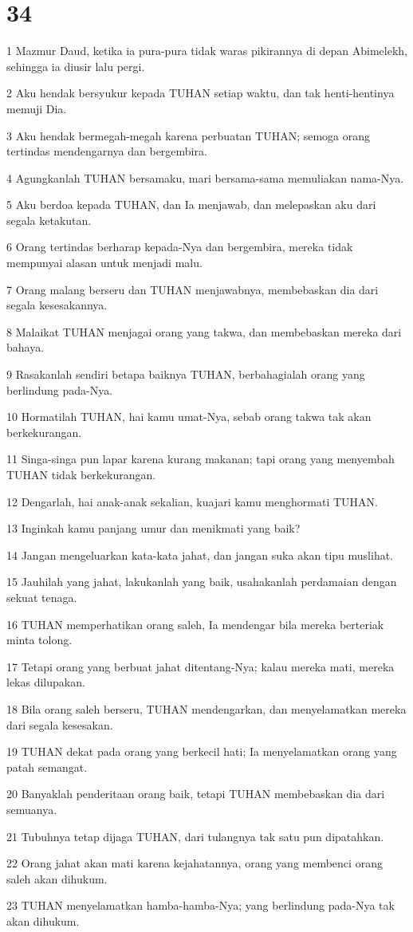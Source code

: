 \chapter{34}

\par 1 Mazmur Daud, ketika ia pura-pura tidak waras pikirannya di depan Abimelekh, sehingga ia diusir lalu pergi.
\par 2 Aku hendak bersyukur kepada TUHAN setiap waktu, dan tak henti-hentinya memuji Dia.
\par 3 Aku hendak bermegah-megah karena perbuatan TUHAN; semoga orang tertindas mendengarnya dan bergembira.
\par 4 Agungkanlah TUHAN bersamaku, mari bersama-sama memuliakan nama-Nya.
\par 5 Aku berdoa kepada TUHAN, dan Ia menjawab, dan melepaskan aku dari segala ketakutan.
\par 6 Orang tertindas berharap kepada-Nya dan bergembira, mereka tidak mempunyai alasan untuk menjadi malu.
\par 7 Orang malang berseru dan TUHAN menjawabnya, membebaskan dia dari segala kesesakannya.
\par 8 Malaikat TUHAN menjagai orang yang takwa, dan membebaskan mereka dari bahaya.
\par 9 Rasakanlah sendiri betapa baiknya TUHAN, berbahagialah orang yang berlindung pada-Nya.
\par 10 Hormatilah TUHAN, hai kamu umat-Nya, sebab orang takwa tak akan berkekurangan.
\par 11 Singa-singa pun lapar karena kurang makanan; tapi orang yang menyembah TUHAN tidak berkekurangan.
\par 12 Dengarlah, hai anak-anak sekalian, kuajari kamu menghormati TUHAN.
\par 13 Inginkah kamu panjang umur dan menikmati yang baik?
\par 14 Jangan mengeluarkan kata-kata jahat, dan jangan suka akan tipu muslihat.
\par 15 Jauhilah yang jahat, lakukanlah yang baik, usahakanlah perdamaian dengan sekuat tenaga.
\par 16 TUHAN memperhatikan orang saleh, Ia mendengar bila mereka berteriak minta tolong.
\par 17 Tetapi orang yang berbuat jahat ditentang-Nya; kalau mereka mati, mereka lekas dilupakan.
\par 18 Bila orang saleh berseru, TUHAN mendengarkan, dan menyelamatkan mereka dari segala kesesakan.
\par 19 TUHAN dekat pada orang yang berkecil hati; Ia menyelamatkan orang yang patah semangat.
\par 20 Banyaklah penderitaan orang baik, tetapi TUHAN membebaskan dia dari semuanya.
\par 21 Tubuhnya tetap dijaga TUHAN, dari tulangnya tak satu pun dipatahkan.
\par 22 Orang jahat akan mati karena kejahatannya, orang yang membenci orang saleh akan dihukum.
\par 23 TUHAN menyelamatkan hamba-hamba-Nya; yang berlindung pada-Nya tak akan dihukum.

